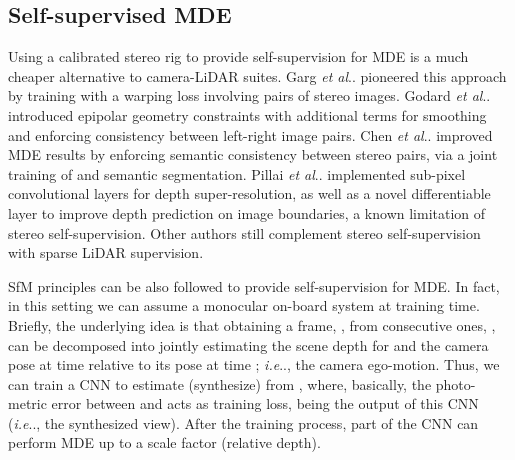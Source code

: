 \documentclass[journal]{IEEEtran}
\makeatletter
\DeclareRobustCommand\onedot{\futurelet\@let@token\@onedot}
\def\@onedot{\ifx\@let@token.\else.\null\fi\xspace}
\def\ie{\emph{i.e}\onedot} \def\Ie{\emph{I.e}\onedot}
\def\etal{\emph{et al}\onedot}
\makeatother
\begin{document}
\subsection{Self-supervised MDE}
\label{sec:rw:self-supervised}

Using a calibrated stereo rig to provide self-supervision for MDE is a much cheaper alternative to camera-LiDAR suites. Garg {\etal} \cite{Garg:2016} pioneered this approach by training  with a warping loss involving pairs of stereo images. Godard {\etal} \cite{Godard:2017} introduced epipolar geometry constraints with additional terms for smoothing and enforcing consistency between left-right image pairs. Chen {\etal} \cite{Chen:2019} improved MDE results by enforcing semantic consistency between stereo pairs, via a joint training of  and semantic segmentation. Pillai {\etal} \cite{Pillai:2019} implemented sub-pixel convolutional layers for depth super-resolution, as well as a novel differentiable layer to improve depth prediction on image boundaries, a known limitation of stereo self-supervision. Other authors \cite{Kuznietsov:2017, He:2018wearable} still complement stereo self-supervision with sparse LiDAR supervision.

SfM principles \cite{Ozyesil:2017} can be also followed to provide self-supervision for MDE. In fact, in this setting we can assume a monocular on-board system at training time. Briefly, the underlying idea is that obtaining a frame, , from consecutive ones, , can be decomposed into jointly estimating the scene depth for  and the camera pose at time  relative to its pose at time ; {\ie}, the camera ego-motion. Thus, we can train a CNN to estimate (synthesize)  from , where, basically, the photo-metric error between  and  acts as training loss, being  the output of this CNN ({\ie}, the synthesized view). After the training process, part of the CNN can perform MDE up to a scale factor (relative depth).
\end{document}
